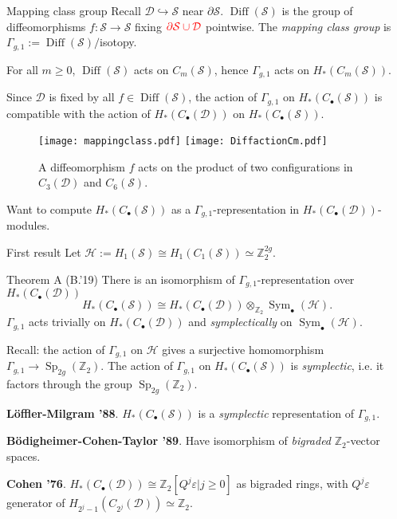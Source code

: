 \documentclass[10pt]{beamer}
\renewcommand{\epsilon}{\varepsilon}
\newcommand{\Z}{\mathbb{Z}}
\renewcommand{\H}{\mathcal{H}}
\newcommand{\D}{\mathcal{D}}
\renewcommand{\S}{\mathcal{S}}
\renewcommand{\gg}{\Gamma_{g,1}}
\newcommand{\Cb}{C_{\bullet}}
\DeclareMathOperator{\Diff}{Diff}
\DeclareMathOperator{\Sym}{Sym}
\DeclareMathOperator{\Sp}{Sp}
\begin{document}
\begin{frame}{Mapping class group}
Recall $\D\hookrightarrow\S$ near $\partial \S$. $\Diff(\S)$ is the group of
diffeomorphisms $f\colon\S\to\S$ fixing $\textcolor{red}{\partial\S\cup\D}$ pointwise.
The \emph{mapping class group} is $\gg:=\Diff(\S)/$isotopy.

\pause
\vspace{0.1cm}
For all $m\geq 0$, $\Diff(\S)$ acts on $C_m(\S)$, hence $\gg$ acts on $H_*(C_m(\S))$.

\pause
Since $\D$ is fixed by all $f\in\Diff(\S)$, the action of $\gg$ on $H_*(\Cb(\S))$ is compatible
with the action of $H_*(\Cb(\D))$ on $H_*(\Cb(\S))$.
\pause
\begin{figure}[h]
\texttt{[image: mappingclass.pdf]}
\vspace{1mm}
\texttt{[image: DiffactionCm.pdf]}
\caption{A diffeomorphism $f$ acts on the product of two configurations in $C_3(\D)$ and $C_6(\S)$.}
\end{figure}

\pause
\vspace{-0.3cm}
Want to compute $H_*(\Cb(\S))$ as a $\gg$-representation in $H_*(\Cb(\D))$-modules.
\end{frame}




\begin{frame}{First result}
Let $\H:=H_1(\S)\cong H_1(C_1(\S))\simeq\Z_2^{2g}$.
\begin{block}{Theorem A (B.'19)}
There is an isomorphism of $\gg$-representation over $H_*(\Cb(\D))$
\[
 H_*(\Cb(\S))\cong H_*(\Cb(\D))\otimes_{\Z_2}\Sym_{\bullet}(\H).
\]
$\gg$ acts trivially on $H_*(\Cb(\D))$ and \emph{symplectically} on $\Sym_{\bullet}(\H)$.
\end{block}

\pause
Recall: the action of $\gg$ on $\H$ gives a surjective homomorphism $\gg\to\Sp_{2g}(\Z_2)$.
The action of $\gg$ on $H_*(\Cb(\S))$ is \emph{symplectic}, i.e. it
factors through the group $\Sp_{2g}(\Z_2)$.

\pause
\vspace{0.2cm}
\textbf{L\"offler-Milgram '88}. $H_*(\Cb(\S))$ is a \emph{symplectic} representation of $\gg$.

\textbf{B\"odigheimer-Cohen-Taylor '89}. Have isomorphism of \emph{bigraded} $\Z_2$-vector spaces.

\textbf{Cohen '76}. $H_*(\Cb(\D))\cong\Z_2[Q^j\epsilon|j\geq 0]$ as bigraded rings, with $Q^j\epsilon$
generator of $H_{2^j-1}(C_{2^j}(\D))\simeq\Z_2$.
\end{frame}
\end{document}
